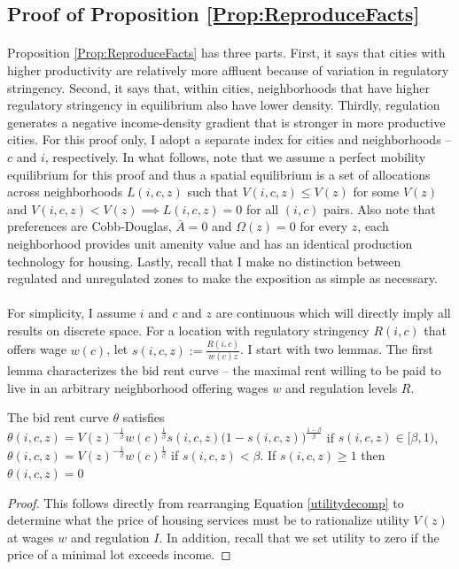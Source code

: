 \documentclass[12pt]{article}
\begin{document}
	\clearpage
	\subsection{Proof of Proposition \ref{Prop:ReproduceFacts}}\label{Proof:ReproduceFacts}
	\paragraph*{}
	Proposition \ref{Prop:ReproduceFacts} has three parts. First, it says that cities with higher productivity are relatively more affluent because of variation in regulatory stringency. Second, it says that, within cities, neighborhoods that have higher regulatory stringency in equilibrium also have lower density. Thirdly, regulation generates a negative income-density gradient that is stronger in more productive cities. For this proof only, I adopt a separate index for cities and neighborhoods -- $c$ and $i$, respectively. In what follows, note that we assume a perfect mobility equilibrium for this proof and thus a spatial equilibrium is a set of allocations across neighborhoods $L(i, c, z)$ such that $V(i, c, z) \leq V(z)$ for some $V(z)$ and $V(i, c, z) < V(z) \implies L(i, c, z) = 0$ for all $(i, c)$ pairs. Also note that preferences are Cobb-Douglas, $\bar{A} = 0$ and $\Omega(z) = 0$ for every $z$, each neighborhood provides unit amenity value and has an identical production technology for housing. Lastly, recall that I make no distinction between regulated and unregulated zones to make the exposition as simple as necessary. 
	
	\paragraph*{}
	For simplicity, I assume $i$ and $c$ and $z$ are continuous which will directly imply all results on discrete space. For a location with regulatory stringency $R(i, c)$ that offers wage $w(c)$, let $s(i, c, z) := \frac{R(i, c)}{w(c)z}$. I start with two lemmas. The first lemma characterizes the bid rent curve -- the maximal rent willing to be paid to live in an arbitrary neighborhood offering wages $w$ and regulation levels $R$. 
	
	\begin{Lemma}
		The bid rent curve $\theta$ satisfies 
		$\theta(i, c, z) = V(z)^{-\frac{1}{\beta}}w(c)^{\frac{1}{\beta}}s(i, c, z)\big(1-s(i, c, z)\big)^{\frac{1 - \beta}{\beta}} $ if $s(i, c, z) \in [\beta, 1)$, $\theta(i, c, z) = V(z)^{-\frac{1}{\beta}}w(c)^{\frac{1}{\beta}}$ if $s(i, c, z) < \beta$. If $s(i, c, z) \geq 1$ then $\theta(i, c, z) = 0$
	\end{Lemma}
	\begin{proof}
		This follows directly from rearranging Equation \eqref{utilitydecomp} to determine what the price of housing services must be to rationalize utility $V(z)$ at wages $w$ and regulation $I$. In addition, recall that we set utility to zero if the price of a minimal lot exceeds income.  
	\end{proof}
	
\end{document}
